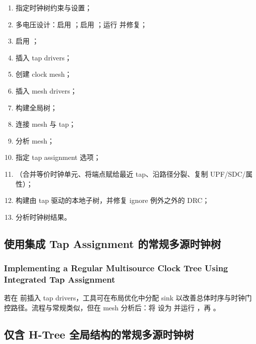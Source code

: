 \begin{enumerate}
  \item 指定时钟树约束与设置；
  \item 多电压设计：启用 ；启用 ；运行  并修复；
  \item 启用 ；
  \item {} 插入 tap drivers；
  \item {} 创建 clock mesh；
  \item {} 插入 mesh drivers；
  \item {} 构建全局树；
  \item {} 连接 mesh 与 tap；
  \item {} 分析 mesh；
  \item 指定 tap assignment 选项；
  \item {}（合并等价时钟单元、将端点赋给最近 tap、沿路径分裂、复制 UPF/SDC/属性）；
  \item {} 构建由 tap 驱动的本地子树，并修复 ignore 例外之外的 DRC；
  \item 分析时钟树结果。
\end{enumerate}

\subsection{使用集成 Tap Assignment 的常规多源时钟树}
\subsubsection*{Implementing a Regular Multisource Clock Tree Using Integrated Tap Assignment}

若在  前插入 tap drivers，工具可在布局优化中分配 sink 以改善总体时序与时钟门控路径。流程与常规类似，但在 mesh 分析后：将  设为  并运行 ，再 。

\subsection{仅含 H-Tree 全局结构的常规多源时钟树}
